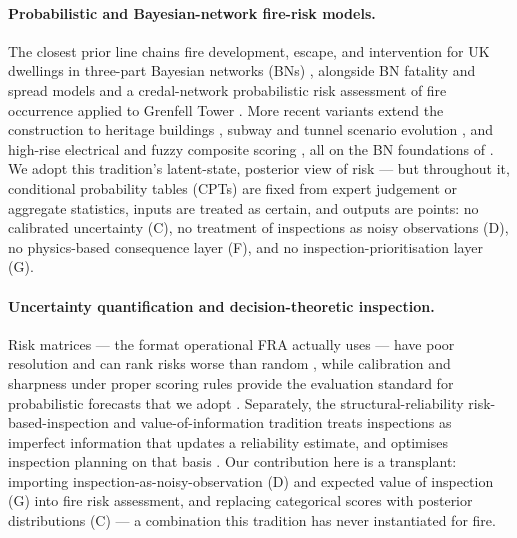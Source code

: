 \paragraph{Probabilistic and Bayesian-network fire-risk models.}
The closest prior line chains fire development, escape, and intervention for UK
dwellings in three-part Bayesian networks (BNs)
\citep{matellini2018threepart,matellini2013}, alongside BN fatality and spread
models \citep{hanea2009,cheng2009} and a credal-network probabilistic risk
assessment of fire occurrence applied to Grenfell Tower
\citep{estradalugo2019grenfell}. More recent variants extend the construction
to heritage buildings \citep{chen2023hist}, subway and tunnel scenario
evolution \citep{li2024subway,hidayat2025tunnel}, and high-rise electrical and
fuzzy composite scoring \citep{su2023electrical,wang2021fuzzy,tan2021tho}, all
on the BN foundations of \citet{pearl1988}. We adopt this tradition's
latent-state, posterior view of risk --- but throughout it, conditional
probability tables (CPTs) are fixed from expert judgement or aggregate
statistics, inputs are treated as certain, and outputs are points: no
calibrated uncertainty (C), no treatment of inspections as noisy observations
(D), no physics-based consequence layer (F), and no inspection-prioritisation
layer (G).

\paragraph{Uncertainty quantification and decision-theoretic inspection.}
Risk matrices --- the format operational FRA actually uses --- have poor
resolution and can rank risks worse than random \citep{cox2008,thomas2014},
while calibration and sharpness under proper scoring rules provide the
evaluation standard for probabilistic forecasts that we adopt
\citep{gneiting2007}. Separately, the structural-reliability
risk-based-inspection and value-of-information tradition treats inspections as
imperfect information that updates a reliability estimate, and optimises
inspection planning on that basis
\citep{straub2005,luque2019,zhang2021voi,vereecken2020,klerk2019}. Our
contribution here is a transplant: importing inspection-as-noisy-observation
(D) and expected value of inspection (G) into fire risk assessment, and
replacing categorical scores with posterior distributions (C) --- a combination
this tradition has never instantiated for fire.

